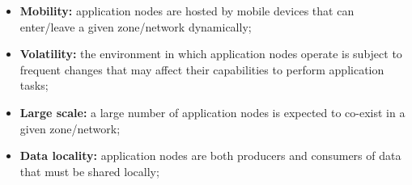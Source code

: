 \begin{itemize}
	
	\item \textbf{Mobility:} application nodes are hosted by mobile devices that can enter/leave a given zone/network dynamically; 
	
	\item \textbf{Volatility:} the environment in which application nodes operate is subject to frequent changes that may affect their capabilities to perform application tasks;
	
	\item \textbf{Large scale:} a large number of application nodes is expected to co-exist in a given zone/network;
	
	\item \textbf{Data locality:} application nodes are 
	both producers and consumers of data that must be shared locally;
	
	
	
	
	
	
	
	
\end{itemize}


